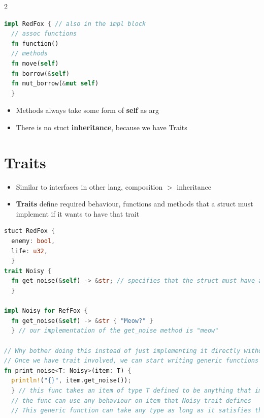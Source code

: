 \documentclass{report}
\begin{document}
\begin{multicols*}{2}
\begin{tcolorbox}[title=Defining Methods,colback=backcolour,size=small,left=4mm]
\begin{lstlisting}[language=rust]
impl RedFox { // also in the impl block
  // assoc functions
  fn function()
  // methods
  fn move(self)
  fn borrow(&self)
  fn mut_borrow(&mut self)
  }
\end{lstlisting}
\end{tcolorbox}

\begin{itemize}
  \item Methods always take some form of \textbf{self} as arg 
  \item There is no stuct \textbf{inheritance}, because we have Traits
\end{itemize}

\section{Traits}

\begin{itemize}
  \item Similar to interfaces in other lang, composition $>$ inheritance 
  \item \textbf{Traits} define required behaviour, functions and methods that a struct
    must implement if it wants to have that trait
\end{itemize}

\begin{tcolorbox}[title=Example,colback=backcolour,size=small,left=4mm]
\begin{lstlisting}[language=rust]
stuct RedFox {
  enemy: bool,
  life: u32,
  }
trait Noisy {
  fn get_noise(&self) -> &str; // specifies that the struct must have a method named get_noise() returning a borrowed string slice if the struct wants to be Noisy
  }

impl Noisy for RefFox {
  fn get_noise(&self) -> &str { "Meow?" }
  } // our implementation of the get_noise method is "meow"

// Why bother doing this instead of just implementing it directly without traits ?
// Once we have trait involved, we can start writing generic functions that accept any value implementing the trait
fn print_noise<T: Noisy>(item: T) {
  println!("{}", item.get_noise());
  } // this func takes an item of type T defined to be anything that implements the Noisy trait
  // the func can use any behaviour on item that Noisy trait defines
  // This generic function can take any type as long as it satisfies the noisy trait


\end{lstlisting}
\end{tcolorbox}
\end{multicols*}
\end{document}
